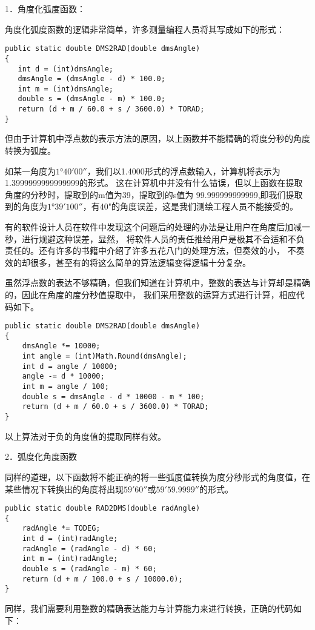 1．角度化弧度函数：

角度化弧度函数的逻辑非常简单，许多测量编程人员将其写成如下的形式：
\begin{verbatim}
public static double DMS2RAD(double dmsAngle)
{
   int d = (int)dmsAngle;
   dmsAngle = (dmsAngle - d) * 100.0;
   int m = (int)dmsAngle;
   double s = (dmsAngle - m) * 100.0;
   return (d + m / 60.0 + s / 3600.0) * TORAD;
}
\end{verbatim}
但由于计算机中浮点数的表示方法的原因，以上函数并不能精确的将度分秒的角度转换为弧度。

 如某一角度为$1°40'00''$，我们以1.4000形式的浮点数输入，计算机将表示为1.3999999999999999的形式。
 这在计算机中并没有什么错误，但以上函数在提取角度的分秒时，提取到的m值为39，提取到的s值为
 99.999999999999,即我们提取到的角度为$1°39'100''$，有40"的角度误差，这是我们测绘工程人员不能接受的。
 
 有的软件设计人员在软件中发现这个问题后的处理的办法是让用户在角度后加减一秒，进行规避这种误差，显然，
 将软件人员的责任推给用户是极其不合适和不负责任的。还有许多的书籍中介绍了许多五花八门的处理方法，但奏效的小，
 不奏效的却很多，甚至有的将这么简单的算法逻辑变得逻辑十分复杂。
 
 虽然浮点数的表达不够精确，但我们知道在计算机中，整数的表达与计算却是精确的，因此在角度的度分秒值提取中，
 我们采用整数的运算方式进行计算，相应代码如下。
 
\begin{verbatim}
public static double DMS2RAD(double dmsAngle)
{
    dmsAngle *= 10000; 
    int angle = (int)Math.Round(dmsAngle);
    int d = angle / 10000;
    angle -= d * 10000;
    int m = angle / 100;
    double s = dmsAngle - d * 10000 - m * 100;
    return (d + m / 60.0 + s / 3600.0) * TORAD;
}
\end{verbatim}

 以上算法对于负的角度值的提取同样有效。


2．弧度化角度函数

同样的道理，以下函数将不能正确的将一些弧度值转换为度分秒形式的角度值，在某些情况下转换出的角度将出现$59'60''$或$59'59.9999''$的形式。

\begin{verbatim}
public static double RAD2DMS(double radAngle)
{
    radAngle *= TODEG;
    int d = (int)radAngle;
    radAngle = (radAngle - d) * 60;
    int m = (int)radAngle;
    double s = (radAngle - m) * 60;
    return (d + m / 100.0 + s / 10000.0);
}
\end{verbatim}

同样，我们需要利用整数的精确表达能力与计算能力来进行转换，正确的代码如下：

